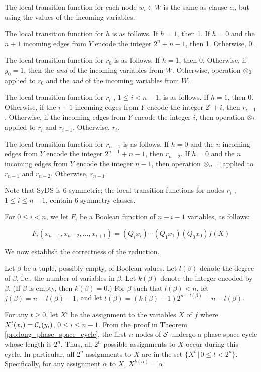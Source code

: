 The local transition function for each node $w_i \in W$ is the same as clause $c_i$,
but using the values of the incoming variables.

The local transition function for $h$ is as follows.
If $h=1$, then 1.
If $h =0$ and  the $n+1$ incoming edges from $Y$ encode the integer $2^n+n-1$, then 1.
Otherwise, $0$.

The local transition function for $r_0$ is as follows.
If $h =1$, then 0.
Otherwise, if $y_0 = 1$, then the {\em and} of the incoming variables from $W$.
Otherwise, operation $\mbox{$\otimes$}_0$ 
applied to $r_0$ and the {\em and} of the incoming variables from $W$.

The local transition function for $r_i$ , $1 \leq i < n-1$, is as follows.
If $h =1$, then 0.
Otherwise, if the $i+1$ incoming edges from $Y$ encode the integer $2^i+i$, 
then $r_{i-1}$.
Otherwise,  if the incoming edges from $Y$ encode the integer $i$, 
then operation $\mbox{$\otimes$}_i$ applied to $r_i$ and $r_{i-1}$.
Otherwise, $r_i$.

The local transition function for $r_{n-1}$ is as follows.
If $h=0$ and the $n$ incoming edges from $Y$ encode the integer $2^{n-1}+n-1$, 
then $r_{n-2}$.
If $h =0$ and  the $n$ incoming edges from $Y$ encode the integer $n-1$, 
then operation $\mbox{$\otimes$}_{n-1}$ applied to $r_{n-1}$ and $r_{n-2}$.
Otherwise, $r_{n-1}$.

Note that SyDS \cals{} is 6-symmetric; the local transition functions
for nodes $r_i$ , $1 \leq i \leq n-1$, contain 6 symmetry classes.

For $0 \leq i < n$, we let $F_i$ be a Boolean function of $n-i-1$ variables, 
as follows:

\smallskip
\noindent
$$F_i(x_{n-1}, x_{n-2}, \ldots , x_{i+1}) = (Q_ i x_i) 
\cdots (Q_1 x_1) (Q_0 x_0) f(X)$$

\smallskip%

We now establish the correctness of the reduction.

\smallskip

Let $\beta$ be a tuple, possibly empty, of Boolean values. 
Let  $l(\beta)$ denote the degree of $\beta$,
i.e., the number of variables in $\beta$.
Let  $k(\beta)$ denote the integer encoded by $\beta$.
(If  $\beta$ is empty, then $k(\beta) = 0$.)
For $\beta$ such that $l(\beta) < n$, 
let $j(\beta) = n - l(\beta) -1$,
and let $t(\beta) = (k(\beta)+1) 2^{n-l(\beta)} +n -l(\beta)$. 

For any $ t \geq 0$,
let  $X^t$ be the assignment to the variables $X$ of $f$ where 
$X^t(x_i) = \mbox{$\mathcal{C}$} _t(y_i)$, $ 0 \leq i \leq n-1$.
From the proof in Theorem \ref{pro:long_phase_space_cycle}, 
the first $n$ nodes of $\mbox{$\mathcal{S}$}$ undergo a phase space cycle whose length is $2^n$.
Thus, all $2^n$ possible assignments to $X$ occur during this cycle.
In particular, all $2^n$ assignments to $X$ are in the set $\{  X^t \, | \, 0 \leq t < 2^n \}$.
Specifically, for any assignment $\alpha$ to $X$, $X^{k(\alpha)} = \alpha$.


